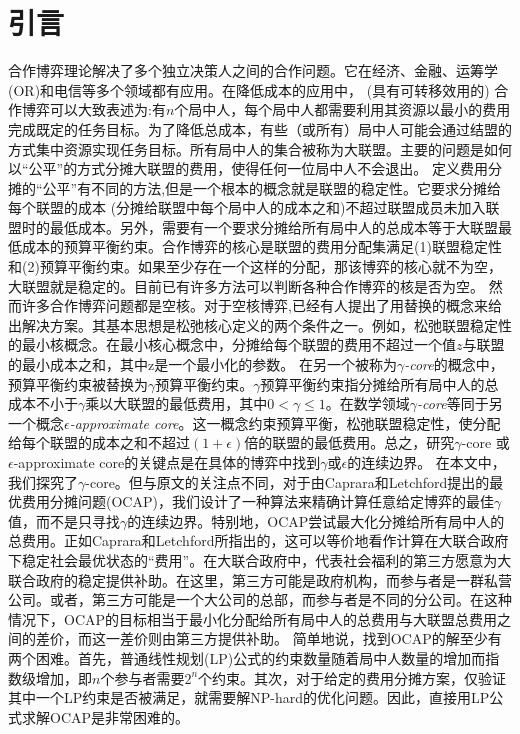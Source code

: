 \documentclass[UTF8]{article}
\begin{document}
\section{引言}
合作博弈理论解决了多个独立决策人之间的合作问题。它在经济、金融、运筹学(OR)和电信等多个领域都有应用。在降低成本的应用中， (具有可转移效用的) 合作博弈可以大致表述为:有$n$个局中人，每个局中人都需要利用其资源以最小的费用完成既定的任务目标。为了降低总成本，有些（或所有）局中人可能会通过结盟的方式集中资源实现任务目标。所有局中人的集合被称为大联盟。主要的问题是如何以“公平”的方式分摊大联盟的费用，使得任何一位局中人不会退出。
定义费用分摊的“公平”有不同的方法,但是一个根本的概念就是联盟的稳定性。它要求分摊给每个联盟的成本 (分摊给联盟中每个局中人的成本之和)不超过联盟成员未加入联盟时的最低成本。另外，需要有一个要求分摊给所有局中人的总成本等于大联盟最低成本的预算平衡约束。合作博弈的核心是联盟的费用分配集满足(1)联盟稳定性和(2)预算平衡约束。如果至少存在一个这样的分配，那该博弈的核心就不为空，大联盟就是稳定的。目前已有许多方法可以判断各种合作博弈的核是否为空。
然而许多合作博弈问题都是空核。对于空核博弈,已经有人提出了用替换的概念来给出解决方案。其基本思想是松弛核心定义的两个条件之一。例如，松弛联盟稳定性的最小核概念。在最小核心概念中，分摊给每个联盟的费用不超过一个值$z$与联盟的最小成本之和，其中z是一个最小化的参数。
在另一个被称为{\em $\gamma$-core}的概念中，预算平衡约束被替换为$\gamma$预算平衡约束。$\gamma$预算平衡约束指分摊给所有局中人的总成本不小于$\gamma$乘以大联盟的最低费用，其中$0<\gamma\leq 1$。在数学领域{\em $\gamma$-core}等同于另一个概念{\em $\epsilon$-approximate core}。这一概念约束预算平衡，松弛联盟稳定性，使分配给每个联盟的成本之和不超过$(1+\epsilon)$倍的联盟的最低费用。总之，研究$\gamma$-core 或 $\epsilon$-approximate core的关键点是在具体的博弈中找到$\gamma$或$\epsilon$的连续边界。
在本文中，我们探究了$\gamma$-core。但与原文的关注点不同，对于由Caprara和Letchford提出的最优费用分摊问题(OCAP)，我们设计了一种算法来精确计算任意给定博弈的最佳$\gamma$值，而不是只寻找$\gamma$的连续边界。特别地，OCAP尝试最大化分摊给所有局中人的总费用。正如Caprara和Letchford所指出的，这可以等价地看作计算在大联合政府下稳定社会最优状态的“费用”。在大联合政府中，代表社会福利的第三方愿意为大联合政府的稳定提供补助。在这里，第三方可能是政府机构，而参与者是一群私营公司。或者，第三方可能是一个大公司的总部，而参与者是不同的分公司。在这种情况下，OCAP的目标相当于最小化分配给所有局中人的总费用与大联盟总费用之间的差价，而这一差价则由第三方提供补助。
简单地说，找到OCAP的解至少有两个困难。首先，普通线性规划(LP)公式的约束数量随着局中人数量的增加而指数级增加，即$n$个参与者需要$2^n$个约束。其次，对于给定的费用分摊方案，仅验证其中一个LP约束是否被满足，就需要解NP-hard的优化问题。因此，直接用LP公式求解OCAP是非常困难的。
\end{document}
